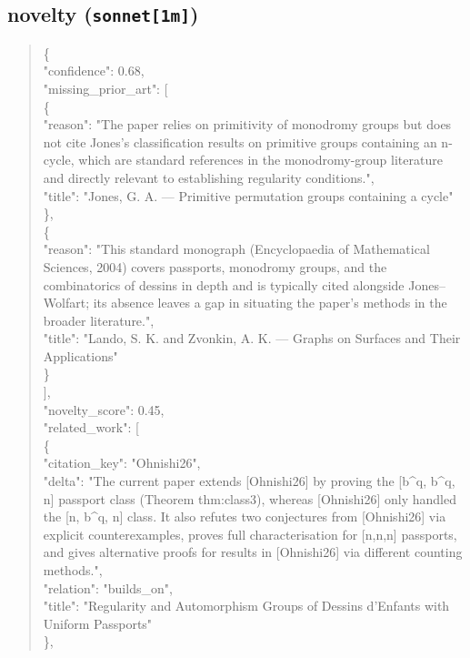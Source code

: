 \documentclass[11pt]{article}
\begin{document}
\subsection*{novelty (\texttt{sonnet[1m]})}
\begin{quote}\small\ttfamily\raggedright
\{\\
  "confidence": 0.68,\\
  "missing\_prior\_art": [\\
    \{\\
      "reason": "The paper relies on primitivity of monodromy groups but does not cite Jones's classification results on primitive groups containing an n-cycle, which are standard references in the monodromy-group literature and directly relevant to establishing regularity conditions.",\\
      "title": "Jones, G. A. --- Primitive permutation groups containing a cycle"\\
    \},\\
    \{\\
      "reason": "This standard monograph (Encyclopaedia of Mathematical Sciences, 2004) covers passports, monodromy groups, and the combinatorics of dessins in depth and is typically cited alongside Jones--Wolfart; its absence leaves a gap in situating the paper's methods in the broader literature.",\\
      "title": "Lando, S. K. and Zvonkin, A. K. --- Graphs on Surfaces and Their Applications"\\
    \}\\
  ],\\
  "novelty\_score": 0.45,\\
  "related\_work": [\\
    \{\\
      "citation\_key": "Ohnishi26",\\
      "delta": "The current paper extends [Ohnishi26] by proving the [b\^{}q, b\^{}q, n] passport class (Theorem thm:class3), whereas [Ohnishi26] only handled the [n, b\^{}q, n] class. It also refutes two conjectures from [Ohnishi26] via explicit counterexamples, proves full characterisation for [n,n,n] passports, and gives alternative proofs for results in [Ohnishi26] via different counting methods.",\\
      "relation": "builds\_on",\\
      "title": "Regularity and Automorphism Groups of Dessins d'Enfants with Uniform Passports"\\
    \},\\

\end{quote}
\end{document}
